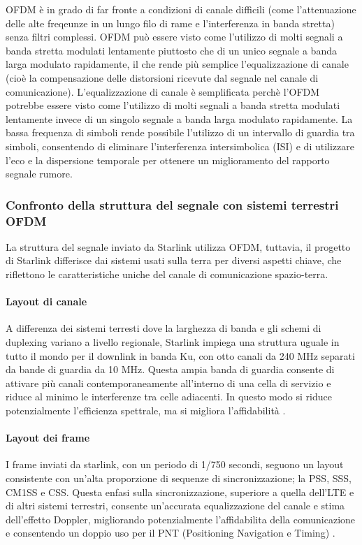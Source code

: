 \ac{OFDM} è in grado di far fronte a condizioni di canale difficili (come l'attenuazione delle alte freqeunze in un lungo filo di rame e l'interferenza in banda stretta) senza filtri complessi.
\ac{OFDM} può essere visto come l'utilizzo di molti segnali a banda stretta modulati lentamente piuttosto che di un unico segnale a banda larga modulato rapidamente, il che rende più semplice l'equalizzazione di canale (cioè la compensazione delle distorsioni ricevute dal segnale nel canale di comunicazione).
L'equalizzazione di canale è semplificata perchè l'\ac{OFDM} potrebbe essere visto come l'utilizzo di molti segnali a banda stretta modulati lentamente invece di un singolo segnale a banda larga modulato rapidamente.
La bassa frequenza di simboli rende possibile l'utilizzo di un intervallo di guardia tra simboli, consentendo di eliminare l'interferenza intersimbolica (ISI) e di utilizzare l'eco e la dispersione temporale per ottenere un miglioramento del rapporto segnale rumore.

\subsubsection{Confronto della struttura del segnale con sistemi terrestri OFDM}
La struttura del segnale inviato da Starlink utilizza \ac{OFDM}, tuttavia, il progetto di Starlink differisce dai sistemi usati sulla terra per diversi aspetti chiave, che riflettono le caratteristiche uniche del canale di comunicazione spazio-terra.

\paragraph{Layout di canale} A differenza dei sistemi terresti dove la larghezza di banda e gli schemi di duplexing variano a livello regionale, Starlink impiega una struttura uguale in tutto il mondo per il downlink in banda Ku, con otto canali da 240 MHz separati da bande di guardia da 10 MHz.
Questa ampia banda di guardia consente di attivare più canali contemporaneamente all'interno di una cella di servizio e riduce al minimo le interferenze tra celle adiacenti.
In questo modo si riduce potenzialmente l'efficienza spettrale, ma si migliora l'affidabilità \cite{humphreys_signal_2023}.

\paragraph{Layout dei frame}
I frame inviati da starlink, con un periodo di 1/750 secondi, seguono un layout consistente con un'alta proporzione di sequenze di sincronizzazione; la PSS, SSS, CM1SS e CSS.
Questa enfasi sulla sincronizzazione, superiore a quella dell'LTE e di altri sistemi terrestri, consente un'accurata equalizzazione del canale e stima dell'effetto Doppler, migliorando potenzialmente l'affidabilita della comunicazione e consentendo un doppio uso per il PNT (Positioning Navigation e Timing) \cite{humphreys_signal_2023}.

